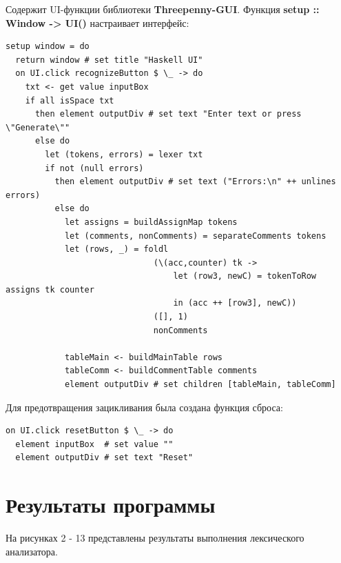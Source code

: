 \documentclass[areasetadvanced]{scrartcl}
\begin{document}
Содержит UI-функции библиотеки \textbf{Threepenny-GUI}.
Функция \textbf{setup :: Window -> UI()} настраивает интерфейс:
\begin{lstlisting}
setup window = do
  return window # set title "Haskell UI"
  on UI.click recognizeButton $ \_ -> do
    txt <- get value inputBox
    if all isSpace txt
      then element outputDiv # set text "Enter text or press \"Generate\""
      else do
        let (tokens, errors) = lexer txt
        if not (null errors)
          then element outputDiv # set text ("Errors:\n" ++ unlines errors)
          else do
            let assigns = buildAssignMap tokens
            let (comments, nonComments) = separateComments tokens
            let (rows, _) = foldl
                              (\(acc,counter) tk ->
                                  let (row3, newC) = tokenToRow assigns tk counter
                                  in (acc ++ [row3], newC))
                              ([], 1)
                              nonComments

            tableMain <- buildMainTable rows
            tableComm <- buildCommentTable comments
            element outputDiv # set children [tableMain, tableComm]
\end{lstlisting}

Для предотвращения зацикливания была создана функция сброса:
\begin{lstlisting}
on UI.click resetButton $ \_ -> do
  element inputBox  # set value ""
  element outputDiv # set text "Reset"
\end{lstlisting}
\newpage 
\section{Результаты программы}
На рисунках 2 - 13 представлены результаты выполнения лексического анализатора. 
\end{document}
